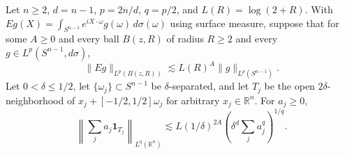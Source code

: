 Let \(n\ge2\), \(d=n-1\), \(p=2n/d\), \(q=p/2\), and \(L(R)=\log(2+R)\). With \(Eg(X)=\int_{S^{n-1}}e^{iX\cdot\omega}g(\omega)\,d\sigma(\omega)\) using surface measure, suppose that for some \(A\ge0\) and every ball \(B(z,R)\) of radius \(R\ge2\) and every \(g\in L^p(S^{n-1},d\sigma)\),
\[
 \|Eg\|_{L^p(B(z,R))}\lesssim L(R)^A\|g\|_{L^p(S^{n-1})}.
\]
Let \(0<\delta\le1/2\), let \(\{\omega_j\}\subset S^{n-1}\) be \(\delta\)-separated, and let \(T_j\) be the open \(2\delta\)-neighborhood of \(x_j+[-1/2,1/2]\omega_j\) for arbitrary \(x_j\in\mathbb R^n\). For \(a_j\ge0\),
\[
 \left\|\sum_j a_j\mathbf1_{T_j}\right\|_{L^q(\mathbb R^n)}
 \lesssim L(1/\delta)^{2A}\left(\delta^d\sum_j a_j^q\right)^{1/q}.
\]
